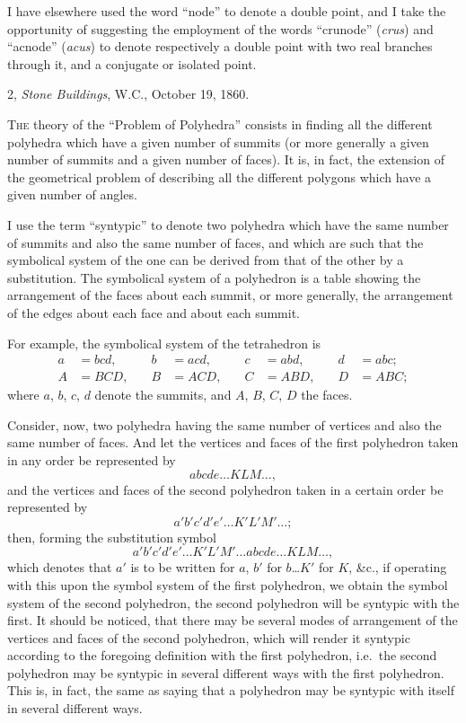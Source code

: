 \documentclass[11pt,a4paper]{book}
\begin{document}
I have elsewhere used the word ``node'' to denote a double point, and I take the opportunity of suggesting the employment of the words ``crunode'' (\textit{crus}) and ``acnode'' (\textit{acus}) to denote respectively a double point with two real branches through it, and a conjugate or isolated point.

\begin{flushright}
2, \textit{Stone Buildings}, W.C., October 19, 1860.
\end{flushright}



\textsc{The} theory of the ``Problem of Polyhedra'' consists in finding all the different polyhedra which have a given number of summits (or more generally a given number of summits and a given number of faces). It is, in fact, the extension of the geometrical problem of describing all the different polygons which have a given number of angles.

I use the term ``syntypic'' to denote two polyhedra which have the same number of summits and also the same number of faces, and which are such that the symbolical system of the one can be derived from that of the other by a substitution. The symbolical system of a polyhedron is a table showing the arrangement of the faces about each summit, or more generally, the arrangement of the edges about each face and about each summit.

For example, the symbolical system of the tetrahedron is
\begin{align*}
a &= bcd, \quad& b &= acd, \quad& c &= abd, \quad& d &= abc; \\
A &= BCD, \quad& B &= ACD, \quad& C &= ABD, \quad& D &= ABC;
\end{align*}
where $a$, $b$, $c$, $d$ denote the summits, and $A$, $B$, $C$, $D$ the faces.

Consider, now, two polyhedra having the same number of vertices and also the same number of faces. And let the vertices and faces of the first polyhedron taken in any order be represented by
\[
abcde\ldots KLM\ldots,
\]
and the vertices and faces of the second polyhedron taken in a certain order be represented by
\[
a'b'c'd'e'\ldots K'L'M'\ldots;
\]
then, forming the substitution symbol
\[
a'b'c'd'e'\ldots K'L'M'\ldots abcde\ldots KLM\ldots,
\]
which denotes that $a'$ is to be written for $a$, $b'$ for $b$\ldots $K'$ for $K$, \&c., if operating with this upon the symbol system of the first polyhedron, we obtain the symbol system of the second polyhedron, the second polyhedron will be syntypic with the first. It should be noticed, that there may be several modes of arrangement of the vertices and faces of the second polyhedron, which will render it syntypic according to the foregoing definition with the first polyhedron, i.e.\ the second polyhedron may be syntypic in several different ways with the first polyhedron. This is, in fact, the same as saying that a polyhedron may be syntypic with itself in several different ways.
\end{document}
